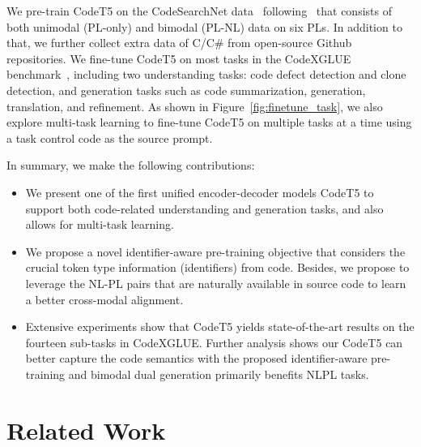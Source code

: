 \documentclass[11pt]{article}
\begin{document}
We pre-train CodeT5 on the CodeSearchNet data~\cite{DBLP:journals/corr/abs-1909-09436} following~\cite{DBLP:conf/emnlp/FengGTDFGS0LJZ20} that consists of both unimodal (PL-only) and bimodal (PL-NL) data on six PLs. 
In addition to that, we further collect extra data of C/C\# from open-source Github repositories. 
We fine-tune CodeT5 on most tasks in the CodeXGLUE benchmark~\cite{DBLP:journals/corr/abs-2102-04664}, including two understanding tasks: code defect detection and clone detection, and generation tasks such as code summarization,  generation, translation, and refinement. 
As shown in Figure~\ref{fig:finetune_task},
we also explore multi-task learning to fine-tune CodeT5 on multiple tasks at a time using a task control code as the source prompt.


\noindent In summary, we make the following contributions: 
\begin{itemize}
\vspace{-0.5em}
\itemsep0em
    \item We present one of the first unified encoder-decoder models CodeT5 to support both code-related understanding and generation tasks, and also   allows for multi-task learning. 
    \item We propose a novel identifier-aware pre-training objective that considers the crucial token type information (identifiers) from code. Besides, we propose to leverage the NL-PL pairs that are naturally available in source code to learn a better cross-modal alignment.
    \item 
    Extensive experiments show that CodeT5 yields state-of-the-art results on the fourteen sub-tasks in CodeXGLUE. Further analysis shows our CodeT5 can better capture the code semantics with the proposed identifier-aware pre-training and bimodal dual generation primarily benefits NLPL tasks.
\end{itemize} \section{Related Work}
\end{document}

